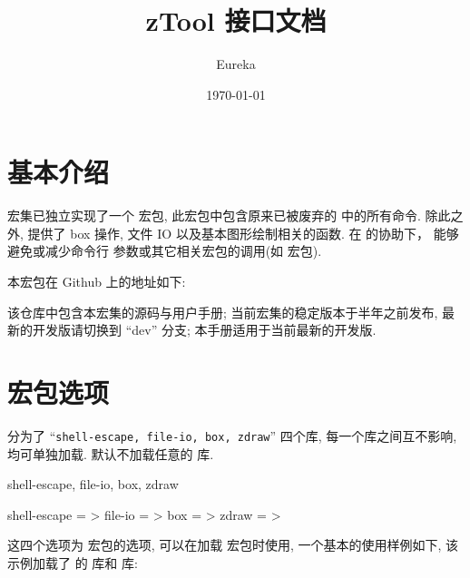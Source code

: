 \documentclass[
  hyper, lang=cn, 
  class=l3dox, 
]{../../zlatex/code/ztex}
\title{\texorpdfstring{zTool{} 接口文档}{zTool 接口文档}}
\author{Eureka}
\date{\today}
\begin{document}
\ExplSyntaxOn
{}
\ExplSyntaxOff
{}
  \maketitle
\restoregeometry

  \ztexslideTF{
    \thispagestyle{empty}
    \tableofcontents
  }{
    \thispagestyle{empty}
    \vspace*{-3em}
    \tableofcontents
    \clearpage
  }
\restoregeometry

\section{基本介绍}
\ztex{} 宏集已独立实现了一个  宏包, 此宏包中包含原来已被废弃的  中的所有命令.
除此之外,  提供了 box 操作, 文件 IO 以及基本图形绘制相关的函数. 在  的协助下，\ztex{} 能够
避免或减少命令行  参数或其它相关宏包的调用(如  宏包).

本宏包在 Github 上的地址如下:

\begin{center}
\end{center}

该仓库中包含本宏集的源码与用户手册; 当前宏集的稳定版本于半年之前发布, 最新的开发版请切换到 ``dev'' 分支; 
本手册适用于当前最新的开发版.

\clearpage
\section{宏包选项}
 分为了 ``\texttt{shell-escape, file-io, box, zdraw}'' 四个库, 每一个库之间互不影响, 均可单独加载.
默认不加载任意的  库.


\begin{keyval}[added=2025-05-22, parent=ztool]{shell-escape, file-io, box, zdraw}
  \begin{syntax}
    shell-escape = >
    file-io      = >
    box          = >
    zdraw        = >
  \end{syntax}
  这四个选项为  宏包的选项, 可以在加载  宏包时使用, 一个基本的使用样例如下,
  该示例加载了  的  库和  库:
\end{keyval}
\begin{DocExample}
\usepackage[shell-escape, box=true]{ztool}
\end{DocExample}
\end{document}
